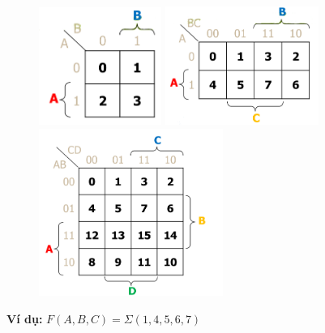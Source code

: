 \documentclass[12pt]{article}
\newcommand{\implicantsol}[3][0]{
    \draw[rounded corners=3pt, fill=#3, opacity=0.3] ($(#2.north west)+(135:#1)$) rectangle ($(#2.south east)+(-45:#1)$);
    }
\newcommand{\implicant}[4][0]{
    \draw[rounded corners=3pt, fill=#4, opacity=0.3] ($(#2.north west)+(135:#1)$) rectangle ($(#3.south east)+(-45:#1)$);
    }
\newenvironment{Karnaughvuit}%
{
\begin{tikzpicture}[baseline=(current bounding box.north),scale=0.8]
\draw (0,0) grid (4,2);
\draw (0,2) -- node [pos=0.7,above right,anchor=south west] {bc} node [pos=0.7,below left,anchor=north east] {a} ++(135:1);
%
\matrix (mapa) [matrix of nodes,
        column sep={0.8cm,between origins},
        row sep={0.8cm,between origins},
        every node/.style={minimum size=0.3mm},
        anchor=4.center,
        ampersand replacement=\&] at (0.5,0.5)
{
                      \& |(c00)| 00         \& |(c01)| 01         \& |(c11)| 11         \& |(c10)| 10         \& |(cf)| \phantom{00} \\
|(r00)| 0             \& |(0)|  \phantom{0} \& |(1)|  \phantom{0} \& |(3)|  \phantom{0} \& |(2)|  \phantom{0} \&                     \\
|(r01)| 1             \& |(4)|  \phantom{0} \& |(5)|  \phantom{0} \& |(7)|  \phantom{0} \& |(6)|  \phantom{0} \&                     \\
|(rf) | \phantom{00}  \&                    \&                    \&                    \&                    \&                     \\
};
}%
{
\end{tikzpicture}
}
\newenvironment{Karnaughquatre}%
{
\begin{tikzpicture}[baseline=(current bounding box.north),scale=0.8]
\draw (0,0) grid (2,2);
\draw (0,2) -- node [pos=0.7,above right,anchor=south west] {b} node [pos=0.7,below left,anchor=north east] {a} ++(135:1);
%
\matrix (mapa) [matrix of nodes,
        column sep={0.8cm,between origins},
        row sep={0.8cm,between origins},
        every node/.style={minimum size=0.3mm},
        anchor=2.center,
        ampersand replacement=\&] at (0.5,0.5)
{
          \& |(c00)| 0          \& |(c01)| 1  \\
|(r00)| 0 \& |(0)|  \phantom{0} \& |(1)|  \phantom{0} \\
|(r01)| 1 \& |(2)|  \phantom{0} \& |(3)|  \phantom{0} \\
};
}%
{
\end{tikzpicture}
}
\newcommand{\minterms}[1]{%
    \foreach \x in {#1}
        \path (\x) node {1};
}
\newcommand{\maxterms}[1]{%
    \foreach \x in {#1}
        \path (\x) node {0};
}
\newcommand{\indeterminats}[1]{%
    \foreach \x in {#1}
        \path (\x) node {X};
}
\begin{document}
\begin{sloppypar}
\begin{figure}[H]
\includegraphics[width=4cm]{k_1.png}
\includegraphics[width=5cm]{k_2.png}
\includegraphics[width=6cm]{k_3.png}
\end{figure}



\begin{tcolorbox}
    \textbf{Ví dụ:} \(F(A,B,C) = \Sigma(1,4,5,6,7) \)
\end{tcolorbox}



\end{sloppypar}
\end{document}
